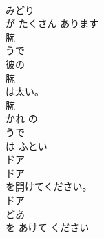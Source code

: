 \documentclass[8pt]{extreport}
\begin{document}
\begin{CJK}{UTF8}{min}
\\	みどり
\\	が たくさん あります	
\\	腕	
\\	うで	
\\	彼の
\\	腕
\\	は太い。	
\\	腕 
\\	かれ の 
\\	うで
\\	は ふとい	
\\	ドア	
\\	ドア
\\	を開けてください。	
\\	ドア 
\\	どあ
\\	を あけて ください	
\end{CJK}
\end{document}
